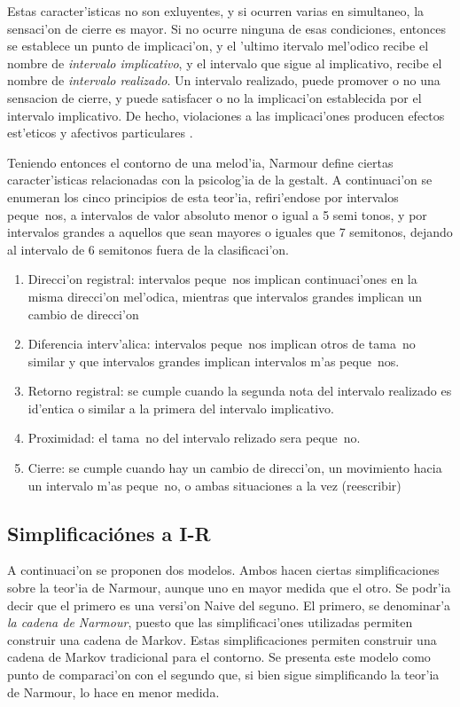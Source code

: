 Estas caracter'isticas no son exluyentes, y si ocurren varias en simultaneo, la sensaci'on de cierre es mayor. 
Si no ocurre ninguna de esas condiciones, entonces se establece un punto de implicaci'on, y el 'ultimo itervalo mel'odico recibe el nombre
de \emph{intervalo implicativo}, y el intervalo que sigue al implicativo, recibe el nombre de \emph{intervalo realizado}. 
Un intervalo realizado, puede promover o no una sensacion de cierre, y puede satisfacer o no la implicaci'on establecida por el intervalo 
implicativo. De hecho, violaciones a las implicaci'ones producen efectos est'eticos y afectivos particulares \citep{Narmour91}.
 
Teniendo entonces el contorno de una melod'ia, Narmour define ciertas caracter'isticas relacionadas con la psicolog'ia de la gestalt. A continuaci'on 
se enumeran los cinco principios de esta teor'ia, refiri'endose por intervalos peque~nos, a intervalos de valor absoluto menor o igual a 5 semi tonos, y por intervalos
grandes a aquellos que sean mayores o iguales que 7 semitonos, dejando al intervalo de 6 semitonos fuera de la clasificaci'on.
\begin{enumerate}
 \item Direcci'on registral: intervalos peque~nos implican continuaci'ones en la misma direcci'on mel'odica, mientras que intervalos grandes implican un cambio de direcci'on
 \item Diferencia interv'alica: intervalos peque~nos implican otros de tama~no similar y que intervalos grandes implican intervalos m'as peque~nos. 
 \item Retorno registral: se cumple cuando la segunda nota del intervalo realizado es id'entica o similar a la primera del intervalo implicativo.
 \item Proximidad: el tama~no del intervalo relizado sera peque~no.
 \item Cierre: se cumple cuando hay un cambio de direcci'on, un movimiento hacia un intervalo m'as peque~no, o ambas situaciones a la vez (\alert{reescribir})
\end{enumerate}

\subsection{Simplificaci\'ones a I-R}
A continuaci'on se proponen dos modelos. Ambos hacen ciertas simplificaciones sobre la teor'ia de Narmour, aunque uno en mayor medida que el otro. Se 
podr'ia decir que el primero es una versi'on Naive del seguno. El primero, se denominar'a \emph{la cadena de Narmour}, puesto que las simplificaci'ones utilizadas
permiten construir una cadena de Markov. Estas simplificaciones permiten construir una cadena de Markov tradicional para el contorno. 
Se presenta este modelo como punto de comparaci'on con el segundo que, si bien sigue simplificando la teor'ia de Narmour, lo hace en menor medida. 

